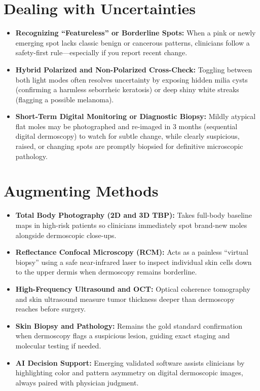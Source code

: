 \section{Dealing with Uncertainties}
\begin{itemize}
\item \textbf{Recognizing ``Featureless'' or Borderline Spots:} When a pink or newly emerging spot lacks classic benign or cancerous patterns, clinicians follow a safety-first rule---especially if you report recent change.
\item \textbf{Hybrid Polarized and Non-Polarized Cross-Check:} Toggling between both light modes often resolves uncertainty by exposing hidden milia cysts (confirming a harmless seborrheic keratosis) or deep shiny white streaks (flagging a possible melanoma).
\item \textbf{Short-Term Digital Monitoring or Diagnostic Biopsy:} Mildly atypical flat moles may be photographed and re-imaged in 3 months (sequential digital dermoscopy) to watch for subtle change, while clearly suspicious, raised, or changing spots are promptly biopsied for definitive microscopic pathology.
\end{itemize}

\section{Augmenting Methods}
\begin{itemize}
\item \textbf{Total Body Photography (2D and 3D TBP):} Takes full-body baseline maps in high-risk patients so clinicians immediately spot brand-new moles alongside dermoscopic close-ups.
\item \textbf{Reflectance Confocal Microscopy (RCM):} Acts as a painless ``virtual biopsy'' using a safe near-infrared laser to inspect individual skin cells down to the upper dermis when dermoscopy remains borderline.
\item \textbf{High-Frequency Ultrasound and OCT:} Optical coherence tomography and skin ultrasound measure tumor thickness deeper than dermoscopy reaches before surgery.
\item \textbf{Skin Biopsy and Pathology:} Remains the gold standard confirmation when dermoscopy flags a suspicious lesion, guiding exact staging and molecular testing if needed.
\item \textbf{AI Decision Support:} Emerging validated software assists clinicians by highlighting color and pattern asymmetry on digital dermoscopic images, always paired with physician judgment.
\end{itemize}

